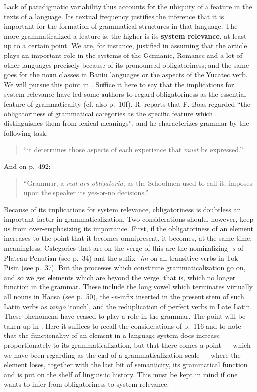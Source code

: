 Lack of paradigmatic variability thus accounts for the ubiquity of a feature in the texts of a language. Its textual frequency justifies the inference that it is important for the formation of grammatical structures in that language. The more grammaticalized a feature is, the higher is its \textbf{system relevance}, at least up to a certain point. We are, for instance, justified in assuming that the article plays an important role in the systems of the Germanic, Romance and a lot of other languages precisely because of its pronounced obligatoriness; and the same goes for the noun classes in Bantu languages or the aspects of the Yucatec verb. We will pursue this point in . Suffice it here to say that the implications for system relevance have led some authors to regard obligatoriness as the essential feature of grammaticality (cf. also p.~10f). R. \citet[489]{Jakobson1959} reports that F. Boas regarded “the obligatoriness of grammatical categories as the specific feature which distinguishes them from lexical meanings”, and he characterizes grammar by the following task:

\begin{quote}
“it determines those aspects of each experience that \textit{must} be expressed.”
\end{quote}

And on p.~492:
\begin{quote}
“Grammar, a \textit{real ars obligatoria}, as the Schoolmen used to call it, imposes upon the speaker its yes-or-no decisions.”
\end{quote}

Because of its implications for system relevance, obligatoriness is doubtless an important factor in grammaticalization. Two considerations should, however, keep us from over-emphasizing its importance. First, if the obligatoriness of an element increases to the point that it becomes omnipresent, it becomes, at the same time, meaningless. Categories that are on the verge of this are the nominalizing -\textit{s} of Plateau Penutian (see p.~34) and the suffix -\textit{im} on all transitive verbs in Tok Pisin (see p.~37). But the processes which constitute grammaticalization go on, and so we get elements which are beyond the verge, that is, which no longer function in the grammar. These include the long vowel which terminates virtually all nouns in Hausa (see p.~50), the -\textit{n}{}-infix inserted in the present stem of such Latin verbs as \textit{tango} ‘touch’, and the reduplication of perfect verbs in Late Latin. These phenomena have ceased to play a role in the grammar. The point will be taken up in . Here it suffices to recall the considerations of p.~116 and to note that the functionality of an element in a language system does increase proportionately to its grammaticalization, but that there comes a point — which we have been regarding as the end of a grammaticalization scale — where the element loses, together with the last bit of semanticity, its grammatical function and is put on the shelf of linguistic history. This must be kept in mind if one wants to infer from obligatoriness to system relevance.

